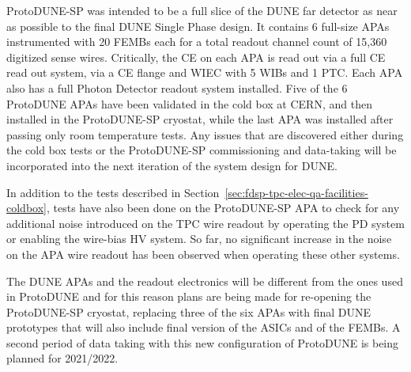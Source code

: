 ProtoDUNE-SP was intended to be a full slice of the DUNE far detector as near as possible to the final DUNE Single Phase design. It contains 6 full-size APAs instrumented with 20 FEMBs each for a total readout channel count of 15,360 digitized sense wires. Critically, the CE on each APA is read out via a full CE read out system, via a CE flange and WIEC with 5 WIBs and 1 PTC. Each APA also has a full Photon Detector readout system installed. Five of the 6 ProtoDUNE APAs have been validated in the cold box at CERN, and then installed in the ProtoDUNE-SP cryostat, while the last APA was installed after passing only room temperature tests. Any issues that are discovered either during the cold box tests or the ProtoDUNE-SP commissioning and data-taking will be incorporated into the next iteration of the system design for DUNE.

In addition to the tests described in Section~\ref{sec:fdsp-tpc-elec-qa-facilities-coldbox}, tests have also been done on the ProtoDUNE-SP APA to check for any additional noise introduced on the TPC wire readout by operating the PD system or enabling the wire-bias HV system. So far, no significant increase in the noise on the APA wire readout has been observed when operating these other systems.

The DUNE APAs and the readout electronics will be different from the ones used in ProtoDUNE and for this reason plans are being made for re-opening the ProtoDUNE-SP cryostat, replacing three of the six APAs with final DUNE prototypes that will also include final version of the ASICs and of the FEMBs. A second period of data taking with this new configuration of ProtoDUNE is being planned for 2021/2022.

